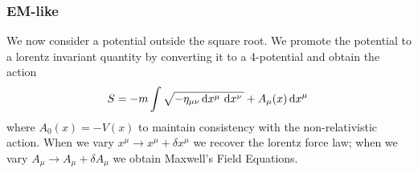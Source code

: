 \subsubsection{EM-like}
We now consider a potential outside the square root. We promote the potential to a lorentz invariant quantity by converting it to a 4-potential and obtain the action
\begin{equation}
	S = -m\int\sqrt{-\eta_{\mu\nu}\d{x^\mu}\d{x^\nu}} + A_\mu(x) \d{x^\mu}
\end{equation}
where \(A_0 (x)= -V(x)\) to maintain consistency with the non-relativistic action. When we vary \(x^\mu \to x^\mu +\delta x^\mu\) we recover the lorentz force law; when we vary \(A_\mu\to A_\mu+\delta A_\mu\) we obtain Maxwell's Field Equations.
